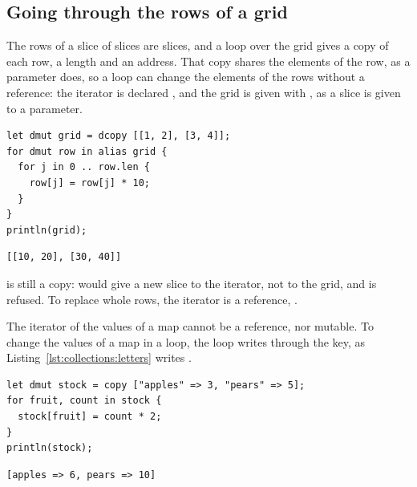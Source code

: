 \subsection{Going through the rows of a grid}

The rows of a slice of slices are slices, and a loop over the grid gives a
copy of each row, a length and an address. That copy shares the elements of the
row, as a parameter does, so a loop can change the elements of the rows without
a reference: the iterator is declared , and the grid is given with
, as a slice is given to a  parameter.

\begin{lstlisting}[style=coloredverbatim]
let dmut grid = dcopy [[1, 2], [3, 4]];
for dmut row in alias grid {
  for j in 0 .. row.len {
    row[j] = row[j] * 10;
  }
}
println(grid);
\end{lstlisting}
\vspace{-10pt}%
\begin{lstlisting}[style=bashVerb]
[[10, 20], [30, 40]]
\end{lstlisting}

 is still a copy:  would give a new slice
to the iterator, not to the grid, and is refused. To replace whole rows, the
iterator is a reference, .

The iterator of the values of a map cannot be a reference, nor mutable. To
change the values of a map in a loop, the loop writes through the key, as
Listing~\ref{lst:collections:letters} writes .

\begin{lstlisting}[style=coloredverbatim]
let dmut stock = copy ["apples" => 3, "pears" => 5];
for fruit, count in stock {
  stock[fruit] = count * 2;
}
println(stock);
\end{lstlisting}
\vspace{-10pt}%
\begin{lstlisting}[style=bashVerb]
[apples => 6, pears => 10]
\end{lstlisting}
